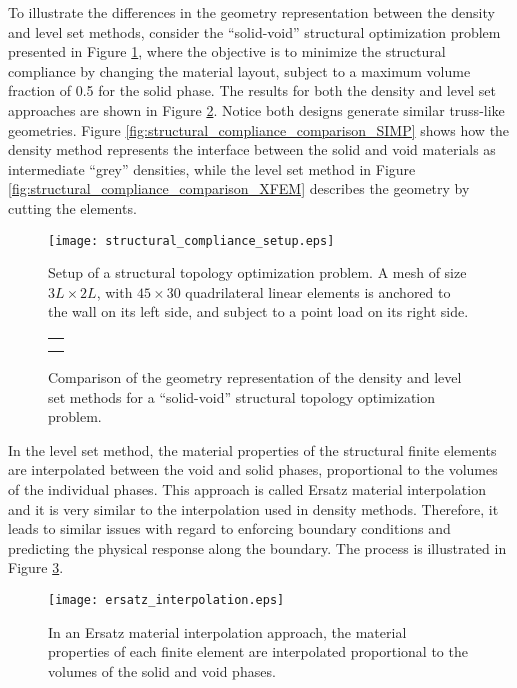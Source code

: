 To illustrate the differences in the geometry representation between the density and level set methods, consider the ``solid-void'' structural optimization problem presented in Figure \ref{fig:structural_compliance_setup}, where the objective is to minimize the structural compliance by changing the material layout, subject to a maximum volume fraction of 0.5 for the solid phase. The results for both the density and level set approaches are shown in Figure \ref{fig:structural_compliance_comparison}. Notice both designs generate similar truss-like geometries. Figure \ref{fig:structural_compliance_comparison_SIMP} shows how the density method represents the interface between the solid and void materials as intermediate ``grey'' densities, while the level set method in Figure \ref{fig:structural_compliance_comparison_XFEM} describes the geometry by cutting the elements.
%
\begin{figure}[H]
	\centering
	\texttt{[image: structural\_compliance\_setup.eps]}
	\caption{Setup of a structural topology optimization problem. A mesh of size $3L \times 2L$, with $45 \times 30$ quadrilateral linear elements is anchored to the wall on its left side, and subject to a point load on its right side.}
	\label{fig:structural_compliance_setup}
\end{figure}
%
\begin{figure}[H]
	\centering
	\begin{tabularx}{0.75\linewidth}{X}
		\subfloat[Density method.]{
			\label{fig:structural_compliance_comparison_SIMP}
			\texttt{[image: structural\_compliance\_comparison\_SIMP.eps]}
		} \\
		\subfloat[Level set method.]{
			\label{fig:structural_compliance_comparison_XFEM}
			\texttt{[image: structural\_compliance\_comparison\_XFEM.eps]}
		}
	\end{tabularx}
	\caption{Comparison of the geometry representation of the density and level set methods for a ``solid-void'' structural topology optimization problem.}
	\label{fig:structural_compliance_comparison}
\end{figure}

In the level set method, the material properties of the structural finite elements are interpolated between the void and solid phases, proportional to the volumes of the individual phases. This approach is called Ersatz material interpolation and it is very similar to the interpolation used in density methods. Therefore, it leads to similar issues with regard to enforcing boundary conditions and predicting the physical response along the boundary. The process is illustrated in Figure \ref{fig:ersatz_interpolation}.
%
\begin{figure}[H]
	\centering
	\texttt{[image: ersatz\_interpolation.eps]}
	\caption{In an Ersatz material interpolation approach, the material properties of each finite element are interpolated proportional to the volumes of the solid and void phases.}
	\label{fig:ersatz_interpolation}
\end{figure}

